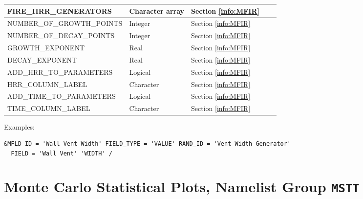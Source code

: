 \begin{landscape}
\begin{longtable}{|l|l|l|l|l|}
{\ct FIRE\_HRR\_GENERATORS}                                 & Character array   & Section \ref{info:MFIR}   &      &     \\ \hline
{\ct NUMBER\_OF\_GROWTH\_POINTS}                            & Integer           & Section \ref{info:MFIR}   &      &     \\ \hline
{\ct NUMBER\_OF\_DECAY\_POINTS}                             & Integer           & Section \ref{info:MFIR}   &      &     \\ \hline
{\ct GROWTH\_EXPONENT}                                      & Real              & Section \ref{info:MFIR}   &      &     \\ \hline
{\ct DECAY\_EXPONENT}                                       & Real              & Section \ref{info:MFIR}   &      &     \\ \hline
{\ct ADD\_HRR\_TO\_PARAMETERS}                              & Logical           & Section \ref{info:MFIR}   &      &     \\ \hline
{\ct HRR\_COLUMN\_LABEL}                                    & Character         & Section \ref{info:MFIR}   &      &     \\ \hline
{\ct ADD\_TIME\_TO\_PARAMETERS}                             & Logical           & Section \ref{info:MFIR}   &      &     \\ \hline
{\ct TIME\_COLUMN\_LABEL}                                   & Character         & Section \ref{info:MFIR}   &      &     \\ \hline


\end{longtable}
\end{landscape}
\noindent Examples:
\begin{lstlisting}
&MFLD ID = 'Wall Vent Width' FIELD_TYPE = 'VALUE' RAND_ID = 'Vent Width Generator'
  FIELD = 'Wall Vent' 'WIDTH' /
\end{lstlisting}


\clearpage

\section{Monte Carlo Statistical Plots, Namelist Group \texorpdfstring{{\tt MSTT}}{MSTT}}

